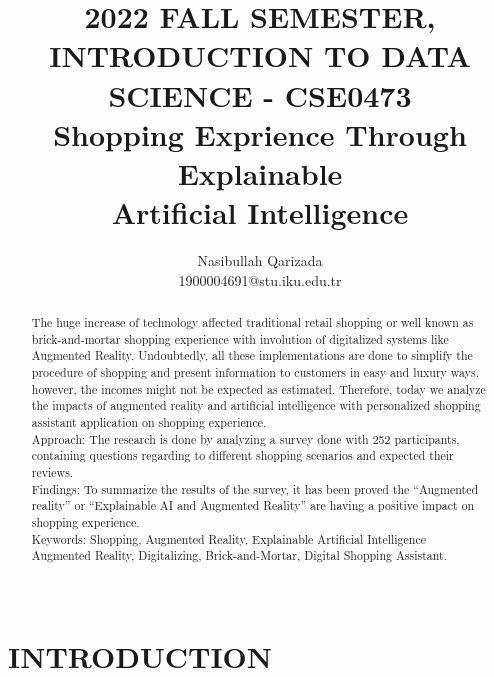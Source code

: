 \documentclass[letterpaper, 10 pt, conference]{ieeeconf}
\title{
		\usefont{OT1}{bch}{b}{n}
		\normalfont \normalsize \textsc{2022 FALL SEMESTER, INTRODUCTION TO DATA SCIENCE - CSE0473}\\ [18pt]
		\huge Shopping Exprience Through Explainable\\Artificial Intelligence \\

}
\author{Nasibullah Qarizada \\ 1900004691@stu.iku.edu.tr}
\begin{document}
\maketitle

\begin{strip}
\begin{abstract}

The huge increase of technology affected traditional retail shopping or well known as brick-and-mortar shopping experience with involution of digitalized systems like Augmented Reality. Undoubtedly, all these implementations are done to simplify the procedure of shopping and present information to customers in easy and luxury ways. however, the incomes might not be expected as estimated. Therefore, today we analyze the impacts of augmented reality and artificial intelligence with personalized shopping assistant application on shopping experience.
\\Approach: The research is done by analyzing a survey done with 252 participants, containing questions regarding to different shopping scenarios and expected their reviews.
\\Findings: To summarize the results of the survey, it has been proved the “Augmented reality” or “Explainable AI and Augmented Reality” are having a positive impact on shopping experience.
\\Keywords: Shopping, Augmented Reality, Explainable Artificial Intelligence Augmented Reality, Digitalizing, Brick-and-Mortar, Digital Shopping Assistant.\\\\

\end{abstract}
\end{strip}


\section{INTRODUCTION}
\end{document}
